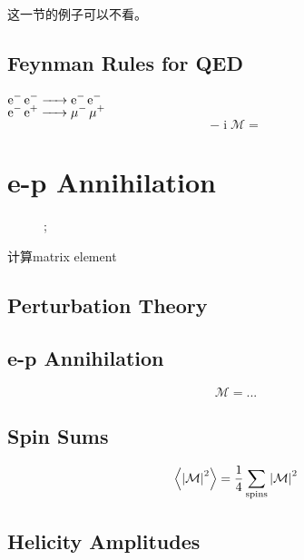 \documentclass[a4paper]{article}
\DeclareMathOperator{\I}{\mathrm{i}}
\numberwithin{equation}{section}
\begin{document}
这一节的例子可以不看。

\subsection{Feynman Rules for QED}

$ \ce{e^- e^- -> e^- e^-} $\\

$ \ce{e^- e^+ -> \mu^- \mu^+} $\\
\begin{equation}\label{key}
-\I \mathcal{M} = 
\end{equation}

\section{e-p Annihilation}
\begin{figure}[H]
	\centering
    ;
\end{figure}

计算matrix element

\subsection{Perturbation Theory}

\subsection{e-p Annihilation}
\begin{equation}\label{key}
\mathcal{M} = ...
\end{equation}

\subsection{Spin Sums}




\begin{equation}\label{key}
\ev{\abs{\mathcal{M}}^2} = \dfrac{1}{4}\sum_{\text{spins}} \abs{\mathcal{M}}^2
\end{equation}

\subsection{Helicity Amplitudes}
\end{document}
